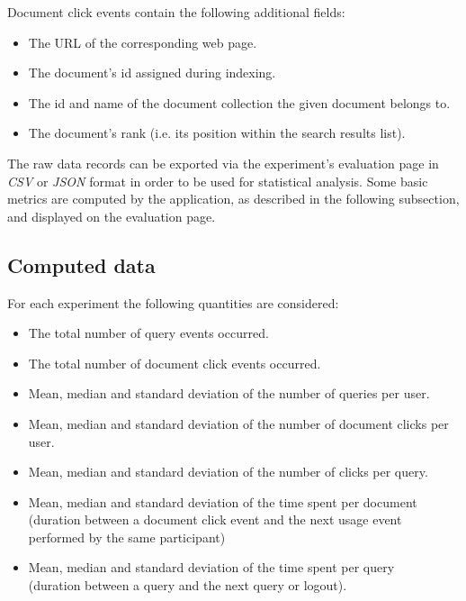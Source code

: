 \documentclass[a4paper]{usiinfbachelorproject}
\begin{document}
Document click events contain the following additional fields:

    \begin{itemize}

        \item
        The URL of the corresponding web page.

        \item
        The document's id assigned during indexing.

        \item
        The id and name of the document collection the given document belongs to.

        \item
        The document's rank (i.e. its position within the search results list).


    \end{itemize}

The raw data records can be exported via the experiment's evaluation page in \emph{CSV} or
\emph{JSON} format in order to be used for statistical analysis. Some basic metrics are
computed by the application, as described in the following subsection, and displayed on the
evaluation page.

\subsection{\textbf{Computed data}} \label{sec:dataPerExperiment}

For each experiment the following quantities are considered:

    \begin{itemize}

        \item
        The total number of query events occurred.

        \item
        The total number of document click events occurred.

        \item
        Mean, median and standard deviation of the number of queries per user.

        \item
        Mean, median and standard deviation of the number of document clicks per user.

        \item
        Mean, median and standard deviation of the number of clicks per query.

        \item
        Mean, median and standard deviation of the time spent per document \\ (duration between a document click event and the next usage event performed by the same participant)

        \item
        Mean, median and standard deviation of the time spent per query \\ (duration between a query and the next query or logout).

    \end{itemize}
\end{document}
